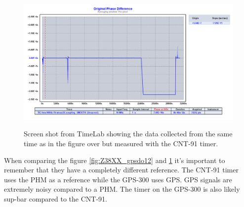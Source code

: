 \documentclass[11pt,english,a4paper]{article}
\begin{document}
\begin{figure}[!htb]
  \centering
    \includegraphics[width=1\textwidth]{timelab_gpsdo1.png}
    \label{fig:TimeLab_gpsdo1}
      \caption{Screen shot from TimeLab showing the data collected from the same time as in the figure over but measured with the CNT-91 timer.}
\end{figure}

When comparing the figure \ref{fig:Z38XX_gpsdo12} and \ref{fig:TimeLab_gpsdo1} it's important to remember that they have a completely different reference. The CNT-91 timer uses the PHM as a reference while the GPS-300 uses GPS. GPS signals are extremely noisy compared to a PHM. The timer on the GPS-300 is also likely sup-bar compared to the CNT-91.  
\end{document}
